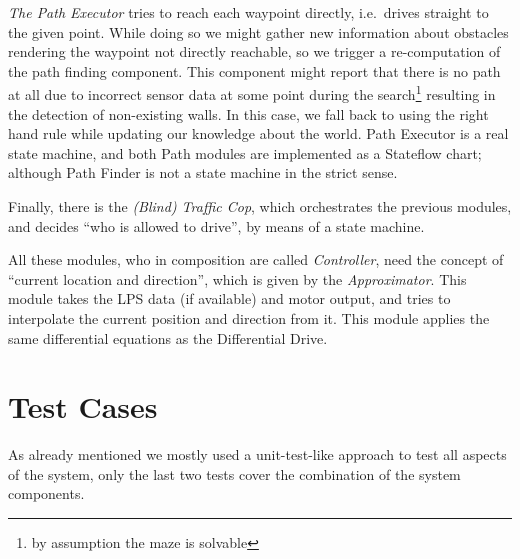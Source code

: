 \documentclass[a4paper,parskip,headheight=38pt]{scrartcl} %
\begin{document}
\emph{The Path Executor} tries to reach each waypoint directly, i.e.\ drives straight to the given point. 
While doing so we might gather new information about obstacles rendering the waypoint not directly reachable, so we trigger a re-computation of the path finding component. 
This component might report that there is no path at all due to incorrect sensor data at some point during the search\footnote{by assumption the maze is solvable} resulting in the detection of non-existing walls. 
In this case, we fall back to using the right hand rule while updating our knowledge about the world. Path Executor is a real state machine, and both Path modules are implemented as a Stateflow chart; although Path Finder is not a state machine in the strict sense.

Finally, there is the \emph{(Blind) Traffic Cop}, which orchestrates the previous modules, and decides \enquote{who is allowed to drive}, by means of a state machine.

All these modules, who in composition are called \emph{Controller}, need the concept of \enquote{current location and direction}, which is given by the \emph{Approximator}. This module takes the LPS data (if available) and motor output, and tries to interpolate the current position and direction from it. This module applies the same differential equations as the Differential Drive.

\section{Test Cases}
As already mentioned we mostly used a unit-test-like approach to test all aspects of the system, only the last two tests cover the combination of the system components.
\end{document}
